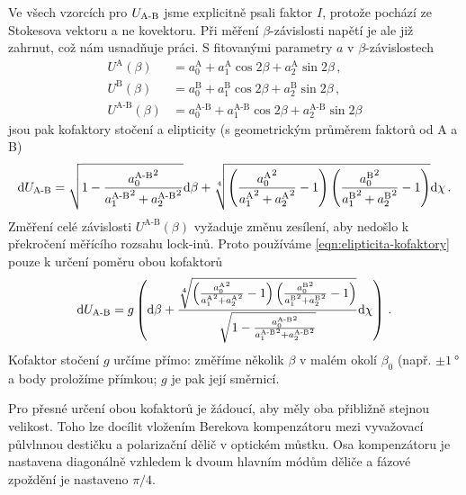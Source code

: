 Ve všech vzorcích pro $U_\textrm{A-B}$ jsme explicitně psali faktor $I$, protože pochází ze Stokesova vektoru a ne kovektoru.
Při měření $\beta$-závislosti napětí je ale již zahrnut, což nám usnadňuje práci.
S fitovanými parametry $a$ v $\beta$-závislostech
\begin{subequations}
\begin{align}
    U^\textrm{A}(\beta) &= a^\textrm{A}_0 + a^\textrm{A}_1 \cos2\beta + a^\textrm{A}_2 \sin2\beta \,,\\
    U^\textrm{B}(\beta) &= a^\textrm{B}_0 + a^\textrm{B}_1 \cos2\beta + a^\textrm{B}_2 \sin2\beta \,,\\
    U^\textrm{A-B}(\beta) &= a^\textrm{A-B}_0 + a^\textrm{A-B}_1 \cos2\beta + a^\textrm{A-B}_2 \sin2\beta
\end{align}
\end{subequations}
jsou pak kofaktory stočení a elipticity (s geometrickým průměrem faktorů od A a B)
\begin{equation}
\label{eqn:elipticita-kofaktory}
\textrm{d}U_\textrm{A-B} = \sqrt{1-\frac{{a^\textrm{A-B}_0}^2}{{a^\textrm{A-B}_1}^2+{a^\textrm{A-B}_2}^2}}\textrm{d}\beta 
+ \sqrt[4]{\left(\frac{{a^\textrm{A}_0}^2}{{a^\textrm{A}_1}^2+{a^\textrm{A}_2}^2}-1 \right)\left(\frac{{a^\textrm{B}_0}^2}{{a^\textrm{B}_1}^2+{a^\textrm{B}_2}^2}-1 \right)}\textrm{d}\chi \,.
\end{equation}
Změření celé závislosti $U^\textrm{A-B}(\beta)$ vyžaduje změnu zesílení, aby nedošlo k překročení měřícího rozsahu lock-inů.
Proto používáme \eqref{eqn:elipticita-kofaktory} pouze k určení poměru obou kofaktorů
\begin{equation}
    \textrm{d}U_\textrm{A-B} = g \left( \textrm{d}\beta + \frac{\sqrt[4]{\left(\frac{{a^\textrm{A}_0}^2}{{a^\textrm{A}_1}^2+{a^\textrm{A}_2}^2}-1 \right)\left(\frac{{a^\textrm{B}_0}^2}{{a^\textrm{B}_1}^2+{a^\textrm{B}_2}^2}-1 \right)}}{\sqrt{1-\frac{{a^\textrm{A-B}_0}^2}{{a^\textrm{A-B}_1}^2+{a^\textrm{A-B}_2}^2}}}\textrm{d}\chi \right) \,.
\end{equation}
Kofaktor stočení $g$ určíme přímo: změříme několik $\beta$ v malém okolí $\beta_0$ (např. $\pm\SI{1}{\degree}$ a body proložíme přímkou; $g$ je pak její směrnicí.

Pro přesné určení obou kofaktorů je žádoucí, aby měly oba přibližně stejnou velikost.
Toho lze docílit vložením Berekova kompenzátoru mezi vyvažovací půlvlnnou destičku a polarizační dělič v optickém můstku.
Osa kompenzátoru je nastavena diagonálně vzhledem k dvoum hlavním módům děliče a fázové zpoždění je nastaveno $\pi/4$.

